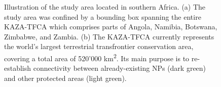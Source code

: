 \documentclass[abstract=on,10pt,a4paper,bibliography=totocnumbered]{article}
\begin{document}
\begin{figure}[h]
  \begin{center}
    \caption{Illustration of the study area located in southern Africa. (a) The
    study area was confined by a bounding box spanning the entire KAZA-TFCA
    which comprises parts of Angola, Namibia, Botswana, Zimbabwe, and Zambia.
    (b) The KAZA-TFCA currently represents the world's largest terrestrial
    transfrontier conservation area, covering a total area of 520'000
    km\textsuperscript{2}. Its main purpose is to re-establish connectivity
    between already-existing NPs (dark green) and other protected areas (light
    green).}
    \label{StudyArea}
  \end{center}
\end{figure}
\end{document}
